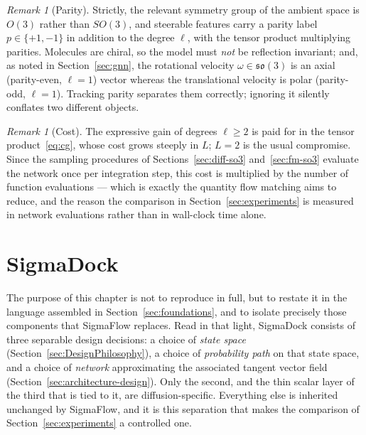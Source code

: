 \documentclass[a4paper,12pt]{article}
\theoremstyle{remark}
\newtheorem{remark}[theorem]{Remark}
\begin{document}
\begin{remark}[Parity]
\label{rem:parity}
Strictly, the relevant symmetry group of the ambient space is $O(3)$ rather than
$SO(3)$, and steerable features carry a parity label $p\in\{+1,-1\}$ in addition to the
degree $\ell$, with the tensor product multiplying parities. Molecules are chiral, so
the model must \emph{not} be reflection invariant; and, as noted in
Section~\ref{sec:gnn}, the rotational velocity $\omega\in\mathfrak{so}(3)$ is an axial
(parity-even, $\ell=1$) vector whereas the translational velocity is polar
(parity-odd, $\ell=1$). Tracking parity separates them correctly; ignoring it silently
conflates two different objects.
\end{remark}

\begin{remark}[Cost]
\label{rem:cost}
The expressive gain of degrees $\ell\ge2$ is paid for in the tensor
product~\eqref{eq:cg}, whose cost grows steeply in $L$; $L=2$ is the usual compromise.
Since the sampling procedures of Sections~\ref{sec:diff-so3} and~\ref{sec:fm-so3}
evaluate the network once per integration step, this cost is multiplied by the number of
function evaluations --- which is exactly the quantity flow matching aims to reduce, and
the reason the comparison in Section~\ref{sec:experiments} is measured in network
evaluations rather than in wall-clock time alone.
\end{remark}



\section{SigmaDock}
\label{sec:SigmaDock}

The purpose of this chapter is not to reproduce \cite{bortoliRiemannianScoreBasedGenerative2022} in full, but to
restate it in the language assembled in Section~\ref{sec:foundations}, and to isolate
precisely those components that SigmaFlow replaces. Read in that light, SigmaDock consists
of three separable design decisions: a choice of \emph{state space} (Section~\ref{sec:DesignPhilosophy}),
a choice of \emph{probability path} on that state space, and a choice of \emph{network}
approximating the associated tangent vector field (Section~\ref{sec:architecture-design}).
Only the second, and the thin scalar layer of the third that is tied to it, are diffusion-specific.
Everything else is inherited unchanged by SigmaFlow, and it is this separation that makes the
comparison of Section~\ref{sec:experiments} a controlled one.
\end{document}
